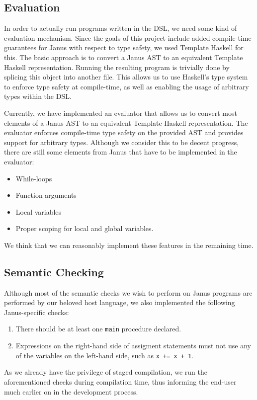\documentclass[12pt,a4paper]{article}
\newcommand{\code}[1]{\texttt{#1}}
\begin{document}
\subsection{Evaluation}
In order to actually run programs written in the DSL, we need some kind of evaluation mechanism. Since the goals of this project include added compile-time guarantees for Janus with respect to type safety, we used Template Haskell for this. The basic approach is to convert a Janus AST to an equivalent Template Haskell representation. Running the resulting program is trivially done by splicing this object into another file. This allows us to use Haskell's type system to enforce type safety at compile-time, as well as enabling the usage of arbitrary types within the DSL.

Currently, we have implemented an evaluator that allows us to convert most elements of a Janus AST to an equivalent Template Haskell representation. The evaluator enforces compile-time type safety on the provided AST and provides support for arbitrary types. Although we consider this to be decent progress, there are still some elements from Janus that have to be implemented in the evaluator:
\begin{itemize}
\item 
While-loops
\item
Function arguments
\item
Local variables
\item
Proper scoping for local and global variables. 
\end{itemize}
We think that we can reasonably implement these features in the remaining time. 

\subsection{Semantic Checking}
Although most of the semantic checks we wish to perform on Janus programs are performed by our beloved host language, we also implemented the following Janus-specific checks:
\begin{enumerate}
\item There should be at least one \code{main} procedure declared.
\item Expressions on the right-hand side of assigment statements must not use any of the variables on the left-hand side, such as \code{x += x + 1}.
\end{enumerate}
As we already have the privilege of staged compilation, we run the aforementioned checks during compilation time, thus informing the end-user much earlier on in the development process.
\end{document}
